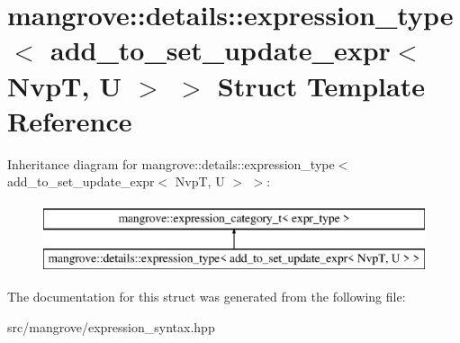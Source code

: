 \hypertarget{structmangrove_1_1details_1_1expression__type_3_01add__to__set__update__expr_3_01NvpT_00_01U_01_4_01_4}{}\section{mangrove\+:\+:details\+:\+:expression\+\_\+type$<$ add\+\_\+to\+\_\+set\+\_\+update\+\_\+expr$<$ NvpT, U $>$ $>$ Struct Template Reference}
\label{structmangrove_1_1details_1_1expression__type_3_01add__to__set__update__expr_3_01NvpT_00_01U_01_4_01_4}
Inheritance diagram for mangrove\+:\+:details\+:\+:expression\+\_\+type$<$ add\+\_\+to\+\_\+set\+\_\+update\+\_\+expr$<$ NvpT, U $>$ $>$\+:\begin{figure}[H]
\begin{center}
\leavevmode
\includegraphics[height=2.000000cm]{structmangrove_1_1details_1_1expression__type_3_01add__to__set__update__expr_3_01NvpT_00_01U_01_4_01_4}
\end{center}
\end{figure}


The documentation for this struct was generated from the following file\+:\begin{DoxyCompactItemize}
\item 
src/mangrove/expression\+\_\+syntax.\+hpp\end{DoxyCompactItemize}
